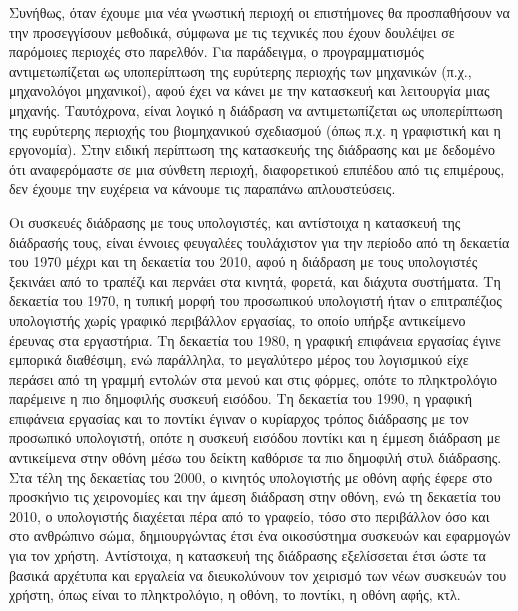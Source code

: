 \documentclass[
]{article}
\begin{document}
Συνήθως, όταν έχουμε μια νέα γνωστική περιοχή οι επιστήμονες θα
προσπαθήσουν να την προσεγγίσουν μεθοδικά, σύμφωνα με τις τεχνικές που
έχουν δουλέψει σε παρόμοιες περιοχές στο παρελθόν. Για παράδειγμα, ο
προγραμματισμός αντιμετωπίζεται ως υποπερίπτωση της ευρύτερης περιοχής
των μηχανικών (π.χ., μηχανολόγοι μηχανικοί), αφού έχει να κάνει με την
κατασκευή και λειτουργία μιας μηχανής. Ταυτόχρονα, είναι λογικό η
διάδραση να αντιμετωπίζεται ως υποπερίπτωση της ευρύτερης περιοχής του
βιομηχανικού σχεδιασμού (όπως π.χ. η γραφιστική και η εργονομία). Στην
ειδική περίπτωση της κατασκευής της διάδρασης και με δεδομένο ότι
αναφερόμαστε σε μια σύνθετη περιοχή, διαφορετικού επιπέδου από τις
επιμέρους, δεν έχουμε την ευχέρεια να κάνουμε τις παραπάνω
απλουστεύσεις.

Οι συσκευές διάδρασης με τους υπολογιστές, και αντίστοιχα η κατασκευή
της διάδρασής τους, είναι έννοιες φευγαλέες τουλάχιστον για την περίοδο
από τη δεκαετία του 1970 μέχρι και τη δεκαετία του 2010, αφού η διάδραση
με τους υπολογιστές ξεκινάει από το τραπέζι και περνάει στα κινητά,
φορετά, και διάχυτα συστήματα. Tη δεκαετία του 1970, η τυπική μορφή του
προσωπικού υπολογιστή ήταν ο επιτραπέζιος υπολογιστής χωρίς γραφικό
περιβάλλον εργασίας, το οποίο υπήρξε αντικείμενο έρευνας στα εργαστήρια.
Τη δεκαετία του 1980, η γραφική επιφάνεια εργασίας έγινε εμπορικά
διαθέσιμη, ενώ παράλληλα, το μεγαλύτερο μέρος του λογισμικού είχε
περάσει από τη γραμμή εντολών στα μενού και στις φόρμες, οπότε το
πληκτρολόγιο παρέμεινε η πιο δημοφιλής συσκευή εισόδου. Τη δεκαετία του
1990, η γραφική επιφάνεια εργασίας και το ποντίκι έγιναν ο κυρίαρχος
τρόπος διάδρασης με τον προσωπικό υπολογιστή, οπότε η συσκευή εισόδου
ποντίκι και η έμμεση διάδραση με αντικείμενα στην οθόνη μέσω του δείκτη
καθόρισε τα πιο δημοφιλή στυλ διάδρασης. Στα τέλη της δεκαετίας του
2000, ο κινητός υπολογιστής με οθόνη αφής έφερε στο προσκήνιο τις
χειρονομίες και την άμεση διάδραση στην οθόνη, ενώ τη δεκαετία του 2010,
ο υπολογιστής διαχέεται πέρα από το γραφείο, τόσο στο περιβάλλον όσο και
στο ανθρώπινο σώμα, δημιουργώντας έτσι ένα οικοσύστημα συσκευών και
εφαρμογών για τον χρήστη. Αντίστοιχα, η κατασκευή της διάδρασης
εξελίσσεται έτσι ώστε τα βασικά αρχέτυπα και εργαλεία να διευκολύνουν
τον χειρισμό των νέων συσκευών του χρήστη, όπως είναι το πληκτρολόγιο, η
οθόνη, το ποντίκι, η οθόνη αφής, κτλ.
\end{document}
